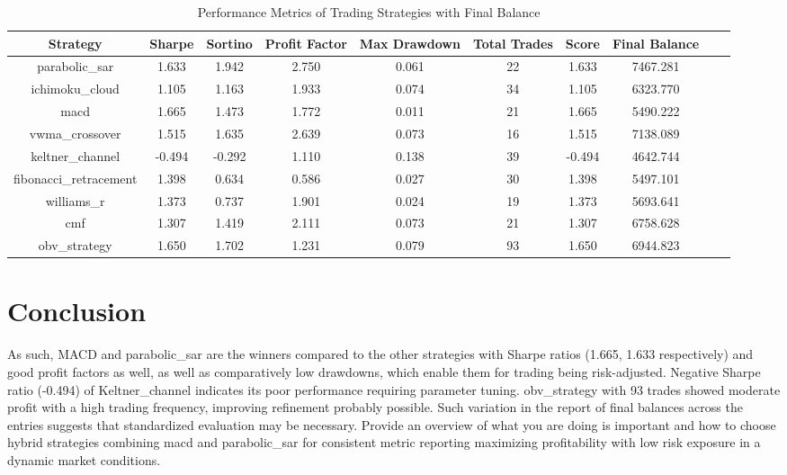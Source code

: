 \begin{table}[h]
\tiny
\centering
\begin{tabular}{|c|c|c|c|c|c|c|c|c|c|}
\hline
\textbf{Strategy} & \textbf{Sharpe} & \textbf{Sortino} & \textbf{Profit Factor} & \textbf{Max Drawdown} & \textbf{Total Trades} & \textbf{Score} & \textbf{Final Balance} \\
\hline
parabolic\_sar & 1.633 & 1.942 & 2.750 & 0.061 & 22 & 1.633 & 7467.281 \\
ichimoku\_cloud & 1.105 & 1.163 & 1.933 & 0.074 & 34 & 1.105 & 6323.770 \\
macd & 1.665 & 1.473 & 1.772 & 0.011 & 21 & 1.665 & 5490.222 \\
vwma\_crossover & 1.515 & 1.635 & 2.639 & 0.073 & 16 & 1.515 & 7138.089 \\
keltner\_channel & -0.494 & -0.292 & 1.110 & 0.138 & 39 & -0.494 & 4642.744 \\
fibonacci\_retracement & 1.398 & 0.634 & 0.586 & 0.027 & 30 & 1.398 & 5497.101 \\
williams\_r & 1.373 & 0.737 & 1.901 & 0.024 & 19 & 1.373 & 5693.641 \\
cmf & 1.307 & 1.419 & 2.111 & 0.073 & 21 & 1.307 & 6758.628 \\
obv\_strategy & 1.650 & 1.702 & 1.231 & 0.079 & 93 & 1.650 & 6944.823 \\
\hline
\end{tabular}
\caption{Performance Metrics of Trading Strategies with Final Balance}
\label{tab:ob_strategy_performance}
\end{table}

\section{Conclusion}
As such, MACD and parabolic\_sar are the winners compared to the other strategies with Sharpe ratios (1.665, 1.633 respectively) and good profit factors as well, as well as comparatively low drawdowns, which enable them for trading being risk-adjusted. Negative Sharpe ratio (-0.494) of Keltner\_channel indicates its poor performance requiring parameter tuning. obv\_strategy with 93 trades showed moderate profit with a high trading frequency, improving refinement probably possible. Such variation in the report of final balances across the entries suggests that standardized evaluation may be necessary. Provide an overview of what you are doing is important and how to choose hybrid strategies combining macd and parabolic\_sar for consistent metric reporting maximizing profitability with low risk exposure in a dynamic market conditions.